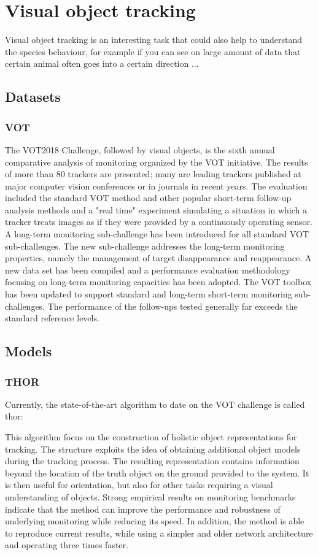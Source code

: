 \pagebreak\section{Visual object tracking}

Visual object tracking is an interesting task that could also help to understand the species behaviour, for example if you can see on large amount of data that certain animal often goes into a certain direction ...

\subsection{Datasets}
\subsubsection{VOT}
The VOT2018\cite{vot2018} Challenge, followed by visual objects, is the sixth annual comparative analysis of monitoring organized by the VOT initiative. The results of more than 80 trackers are presented; many are leading trackers published at major computer vision conferences or in journals in recent years. The evaluation included the standard VOT method and other popular short-term follow-up analysis methods and a "real time" experiment simulating a situation in which a tracker treats images as if they were provided by a continuously operating sensor. A long-term monitoring sub-challenge has been introduced for all standard VOT sub-challenges. The new sub-challenge addresses the long-term monitoring properties, namely the management of target disappearance and reappearance. A new data set has been compiled and a performance evaluation methodology focusing on long-term monitoring capacities has been adopted. The VOT toolbox has been updated to support standard and long-term short-term monitoring sub-challenges. The performance of the follow-ups tested generally far exceeds the standard reference levels.

\pagebreak\subsection{Models}
\subsubsection{THOR}
Currently, the state-of-the-art algorithm to date on the VOT challenge is called thor\cite{thor}:

This algorithm focus on the construction of holistic object representations for tracking. The structure exploits the idea of obtaining additional object models during the tracking process. The resulting representation contains information beyond the location of the truth object on the ground provided to the system. It is then useful for orientation, but also for other tasks requiring a visual understanding of objects. Strong empirical results on monitoring benchmarks indicate that the method can improve the performance and robustness of underlying monitoring while reducing its speed. In addition, the method is able to reproduce current results, while using a simpler and older network architecture and operating three times faster.


